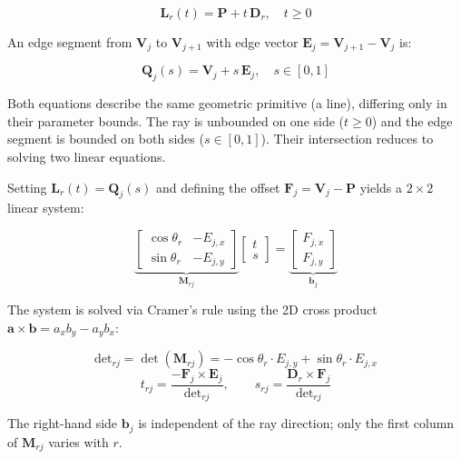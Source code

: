 \begin{equation}
    \mathbf{L}_r(t) = \mathbf{P} + t \, \mathbf{D}_r, \quad t \geq 0
\end{equation}

An edge segment from $\mathbf{V}_j$ to $\mathbf{V}_{j+1}$ with edge vector $\mathbf{E}_j = \mathbf{V}_{j+1} - \mathbf{V}_j$ is:

\begin{equation}
    \mathbf{Q}_j(s) = \mathbf{V}_j + s \, \mathbf{E}_j, \quad s \in [0, 1]
\end{equation}

Both equations describe the same geometric primitive (a line), differing only in their parameter bounds. The ray is unbounded on one side ($t \geq 0$) and the edge segment is bounded on both sides ($s \in [0, 1]$). Their intersection reduces to solving two linear equations.

Setting $\mathbf{L}_r(t) = \mathbf{Q}_j(s)$ and defining the offset $\mathbf{F}_j = \mathbf{V}_j - \mathbf{P}$ yields a $2 \times 2$ linear system:

\begin{equation}
    \underbrace{\begin{bmatrix} \cos\theta_r & -E_{j,x} \\ \sin\theta_r & -E_{j,y} \end{bmatrix}}_{\mathbf{M}_{rj}}
    \begin{bmatrix} t \\ s \end{bmatrix}
    = \underbrace{\begin{bmatrix} F_{j,x} \\ F_{j,y} \end{bmatrix}}_{\mathbf{b}_j}
\end{equation}

The system is solved via Cramer's rule using the 2D cross product $\mathbf{a} \times \mathbf{b} = a_x b_y - a_y b_x$:

\begin{equation}
    \text{det}_{rj} = \det(\mathbf{M}_{rj}) = -\cos\theta_r \cdot E_{j,y} + \sin\theta_r \cdot E_{j,x}
\end{equation}
\begin{equation}
    t_{rj} = \frac{-\mathbf{F}_j \times \mathbf{E}_j}{\text{det}_{rj}}, \qquad
    s_{rj} = \frac{\mathbf{D}_r \times \mathbf{F}_j}{\text{det}_{rj}}
\end{equation}

The right-hand side $\mathbf{b}_j$ is independent of the ray direction; only the first column of $\mathbf{M}_{rj}$ varies with $r$.

